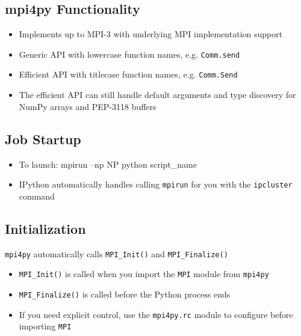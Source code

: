 \documentclass{article}
\begin{document}
    \subsection{mpi4py Functionality}\label{mpi4py-functionality}

\begin{itemize}
\itemsep1pt\parskip0pt
\item
  Implements up to MPI-3 with underlying MPI implementation support
\item
  Generic API with lowercase function names, e.g. \texttt{Comm.send}
\item
  Efficient API with titlecase function names, e.g. \texttt{Comm.Send}
\item
  The efficient API can still handle default arguments and type
  discovery for NumPy arrays and PEP-3118 buffers
\end{itemize}

    \subsection{Job Startup}\label{job-startup}

\begin{itemize}
\itemsep1pt\parskip0pt
\item
  To launch: mpirun --np NP python script\_name
\item
  IPython automatically handles calling \texttt{mpirun} for you with the
  \texttt{ipcluster} command
\end{itemize}

\subsection{Initialization}\label{initialization}

\texttt{mpi4py} automatically calls \texttt{MPI\_Init()} and
\texttt{MPI\_Finalize()}

\begin{itemize}
\itemsep1pt\parskip0pt
\item
  \texttt{MPI\_Init()} is called when you import the \texttt{MPI} module
  from \texttt{mpi4py}
\item
  \texttt{MPI\_Finalize()} is called before the Python process ends
\item
  If you need explicit control, use the \texttt{mpi4py.rc} module to
  configure before importing \texttt{MPI}
\end{itemize}
\end{document}
